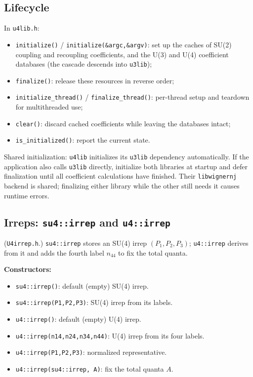 \documentclass[aps,onecolumn,10pt,superscriptaddress,floatfix,nofootinbib]{revtex4}
\begin{document}
\subsection{Lifecycle}
In \verb|u4lib.h|:
\begin{itemize}
    \item \verb|initialize()| / \verb|initialize(&argc,&argv)|: set up the caches of SU(2) coupling and recoupling coefficients, and the U(3) and U(4) coefficient databases (the cascade descends into \texttt{u3lib});
    \item \verb|finalize()|: release these resources in reverse order;
    \item \verb|initialize_thread()| / \verb|finalize_thread()|: per-thread setup and teardown for multithreaded use;
    \item \verb|clear()|: discard cached coefficients while leaving the databases intact;
    \item \verb|is_initialized()|: report the current state.
\end{itemize}
Shared initialization: \texttt{u4lib} initializes its \texttt{u3lib}
dependency automatically. If the application also calls \texttt{u3lib}
directly, initialize both libraries at startup and defer finalization until
all coefficient calculations have finished. Their \texttt{libwignernj} backend is shared;
finalizing either library while the other still needs it causes runtime errors.

\subsection{Irreps: \texttt{su4::irrep} and \texttt{u4::irrep}}
(\verb|U4irrep.h|.) \verb|su4::irrep| stores an SU(4) irrep $(P_1,P_2,P_3)$;
\verb|u4::irrep| derives from it and adds the fourth label $n_{44}$ to fix the total quanta.

\textbf{Constructors:}
\begin{itemize}
    \item \verb|su4::irrep()|: default (empty) SU(4) irrep.
    \item \verb|su4::irrep(P1,P2,P3)|: SU(4) irrep from its labels.
    \item \verb|u4::irrep()|: default (empty) U(4) irrep.
    \item \verb|u4::irrep(n14,n24,n34,n44)|: U(4) irrep from its four labels.
    \item \verb|u4::irrep(P1,P2,P3)|: normalized representative.
    \item \verb|u4::irrep(su4::irrep, A)|: fix the total quanta $A$.
\end{itemize}
\end{document}

